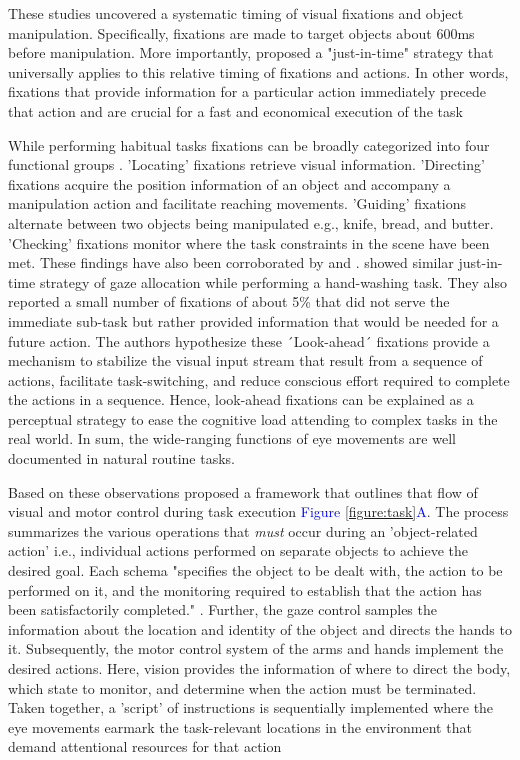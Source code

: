 These studies uncovered a systematic timing of visual fixations and object manipulation. Specifically, fixations are made to target objects about 600ms before manipulation. More importantly, \citet{Ballard1995-ji} proposed a "just-in-time" strategy that universally applies to this relative timing of fixations and actions. In other words, fixations that provide information for a particular action immediately precede that action and are crucial for a fast and economical execution of the task

While performing habitual tasks fixations can be broadly categorized into four functional groups \citep{Land2001-do}. ’Locating’ fixations retrieve visual information. ’Directing’ fixations acquire the position information of an object and accompany a manipulation action and facilitate reaching movements. ’Guiding’ fixations alternate between two objects being manipulated e.g., knife, bread, and butter. ’Checking’ fixations monitor where the task constraints in the scene have been met. These findings have also been corroborated by \citet{Pelz2001-cn} and \citet{Mennie2007-my}. \citet{Pelz2001-cn} showed similar just-in-time strategy of gaze allocation while performing a hand-washing task. They also reported a small number of fixations of about 5\% that did not serve the immediate sub-task but rather provided information that would be needed for a future action. The authors hypothesize these ´Look-ahead´ fixations provide a mechanism to stabilize the visual input stream that result from a sequence of actions, facilitate task-switching, and reduce conscious effort required to complete the actions in a sequence. Hence, look-ahead fixations can be explained as a perceptual strategy to ease the cognitive load attending to complex tasks in the real world. In sum, the wide-ranging functions of eye movements are well documented in natural routine tasks.

Based on these observations \citet{Land2001-do} proposed a framework that outlines that flow of visual and motor control during task execution \textcolor{Blue}{Figure \ref{figure:task}A}. The process summarizes the various operations that \textit{must} occur during an ’object-related action’ i.e., individual actions performed on separate objects to achieve the desired goal. Each schema "specifies the object to be dealt with, the action to be performed on it, and the monitoring required to establish that the action has been satisfactorily completed." \citep{Land2006-da}. Further, the gaze control samples the information about the location and identity of the object and directs the hands to it. Subsequently, the motor control system of the arms and hands implement the desired actions. Here, vision provides the information of where to direct the body, which state to monitor, and determine when the action must be terminated. Taken together, a ’script’ of instructions is sequentially implemented where the eye movements earmark the task-relevant locations in the environment that demand attentional resources for that action

